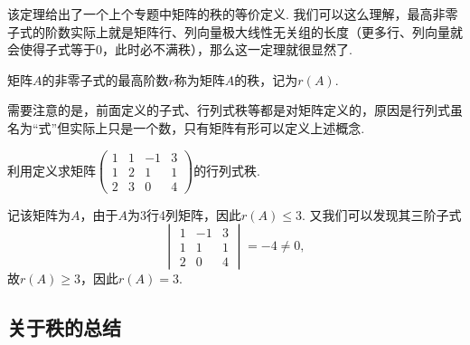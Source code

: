 该定理给出了一个上个专题中矩阵的秩的等价定义. 我们可以这么理解，最高非零子式的阶数实际上就是矩阵行、列向量极大线性无关组的长度（更多行、列向量就会使得子式等于0，此时必不满秩），那么这一定理就很显然了.

\begin{definition}{}{}
    矩阵$A$的非零子式的最高阶数$r$称为矩阵$A$的秩，记为$r(A)$.
\end{definition}

需要注意的是，前面定义的子式、行列式秩等都是对矩阵定义的，原因是行列式虽名为``式''但实际上只是一个数，只有矩阵有形可以定义上述概念.
\begin{example}{}{}
    利用定义求矩阵$\begin{pmatrix}
            1 & 1 & -1 & 3 \\ 1 & 2 & 1 & 1 \\ 2 & 3 & 0 & 4
        \end{pmatrix}$的行列式秩.
\end{example}

\begin{solution}
    记该矩阵为$A$，由于$A$为3行4列矩阵，因此$r(A)\leqslant 3$. 又我们可以发现其三阶子式
    \[\begin{vmatrix}
            1 & -1 & 3 \\ 1 & 1 & 1 \\ 2 & 0 & 4
        \end{vmatrix}=-4\neq 0,\]
    故$r(A)\geqslant 3$，因此$r(A)=3$.
\end{solution}

\subsection{关于秩的总结}

